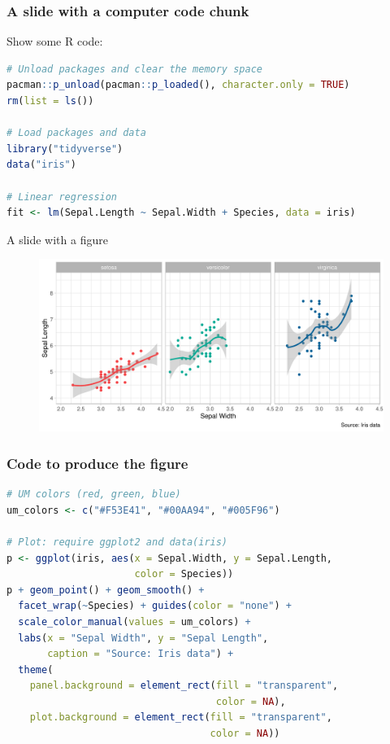 \documentclass[12pt]{beamer}
\begin{document}
\begin{frame}[fragile]\frametitle{A slide with a computer code chunk}

Show some R code:

\begin{lstlisting}[language=R]
# Unload packages and clear the memory space
pacman::p_unload(pacman::p_loaded(), character.only = TRUE)
rm(list = ls())

# Load packages and data
library("tidyverse")
data("iris")

# Linear regression
fit <- lm(Sepal.Length ~ Sepal.Width + Species, data = iris)
\end{lstlisting}

\end{frame}



\begin{frame}{A slide with a figure}

\begin{figure}
\includegraphics[width = \linewidth]{figures/iris}
\end{figure}

\end{frame}

\begin{frame}[fragile]\frametitle{Code to produce the figure}

\begin{lstlisting}[language=R]
# UM colors (red, green, blue)
um_colors <- c("#F53E41", "#00AA94", "#005F96")

# Plot: require ggplot2 and data(iris)
p <- ggplot(iris, aes(x = Sepal.Width, y = Sepal.Length, 
                      color = Species))
p + geom_point() + geom_smooth() + 
  facet_wrap(~Species) + guides(color = "none") + 
  scale_color_manual(values = um_colors) + 
  labs(x = "Sepal Width", y = "Sepal Length", 
       caption = "Source: Iris data") + 
  theme(
    panel.background = element_rect(fill = "transparent", 
                                    color = NA),
    plot.background = element_rect(fill = "transparent", 
                                   color = NA))
\end{lstlisting}

\end{frame}
\end{document}
